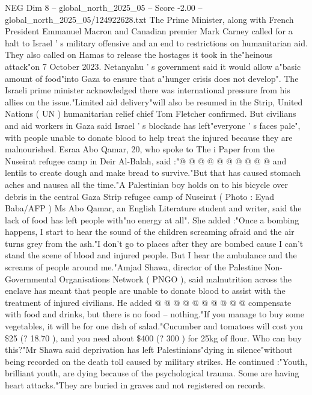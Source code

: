 \begin{textsample}{NEG Dim 8 – global\_north\_2025\_05 – Score -2.00 – global\_north\_2025\_05/124922628.txt}  \label{ex:f8_neg_060}
The Prime Minister, along with French President Emmanuel Macron and Canadian premier Mark Carney called for a halt to Israel ' s military offensive and an end to restrictions on humanitarian aid.
They also called on Hamas to release the hostages it took in the"heinous attack"on 7 October 2023.
Netanyahu ' s government said it would allow a"basic amount of food"into Gaza to ensure that a"hunger crisis does not develop".
The Israeli prime minister acknowledged there was international pressure from his allies on the issue."Limited aid delivery"will also be resumed in the Strip, United Nations ( UN ) humanitarian relief chief Tom Fletcher confirmed.
But civilians and aid workers in Gaza said Israel ' s blockade has left"everyone ' s faces pale", with people unable to donate blood to help treat the injured because they are malnourished.
Esraa Abo Qamar, 20, who spoke to The i Paper from the Nuseirat refugee camp in Deir Al-Balah, said :"@ @ @ @ @ @ @ @ @ @ and lentils to create dough and make bread to survive."But that has caused stomach aches and nausea all the time."A Palestinian boy holds on to his bicycle over debris in the central Gaza Strip refugee camp of Nuseirat ( Photo : Eyad Baba/AFP ) Ms Abo Qamar, an English Literature student and writer, said the lack of food has left people with"no energy at all".
She added :"Once a bombing happens, I start to hear the sound of the children screaming afraid and the air turns grey from the ash."I don't go to places after they are bombed cause I can't stand the scene of blood and injured people.
But I hear the ambulance and the screams of people around me."Amjad Shawa, director of the Palestine Non-Governmental Organisations Network ( PNGO ), said malnutrition across the enclave has meant that people are unable to donate blood to assist with the treatment of injured civilians.
He added @ @ @ @ @ @ @ @ @ @ compensate with food and drinks, but there is no food -- nothing."If you manage to buy some vegetables, it will be for one dish of salad."Cucumber and tomatoes will cost you \$25 (? 18.70 ), and you need about \$400 (? 300 ) for 25kg of flour.
Who can buy this?"Mr Shawa said deprivation has left Palestinians"dying in silence"without being recorded on the death toll caused by military strikes.
He continued :"Youth, brilliant youth, are dying because of the psychological trauma.
Some are having heart attacks."They are buried in graves and not registered on records.

\end{textsample}

